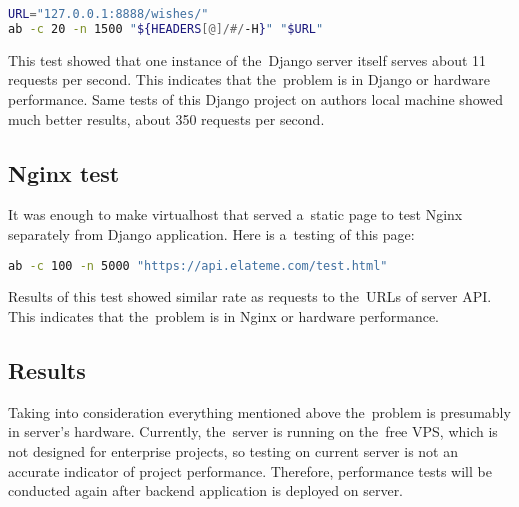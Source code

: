 \begin{lstlisting}[language=bash]
URL="127.0.0.1:8888/wishes/"
ab -c 20 -n 1500 "${HEADERS[@]/#/-H}" "$URL"
\end{lstlisting}

This test showed that one instance of the~Django server itself serves about 11 requests per second. This indicates that
the~problem is in Django or hardware performance. Same tests of this Django project on authors local machine showed much
better results, about 350 requests per second.


\subsection{Nginx test}
It was enough to make virtualhost that served a~static page to test Nginx separately from Django application. Here is
a~testing of this page:

\begin{lstlisting}[language=bash]
ab -c 100 -n 5000 "https://api.elateme.com/test.html"
\end{lstlisting}

Results of this test showed similar rate as requests to the~\ac{URL}s of server \ac{API}. This indicates that
the~problem is in Nginx or hardware performance.


\subsection{Results}
Taking into consideration everything mentioned above the~problem is presu\-mably in server's hardware. Currently,
the~server is running on the~free \ac{VPS}, which is not designed for enterprise projects, so testing on current server
is not an accurate indicator of project performance. Therefore, perfor\-mance tests will be conducted again after
backend application is deployed on  server.


